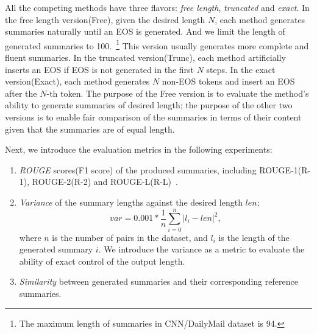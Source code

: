 All the competing methods
have three flavors: {\em free length}, {\em truncated} and {\em exact}.
In the free length version(Free), given the desired length $N$,
each method generates summaries naturally until
an EOS is generated. And we limit the length of generated 
summaries to 100.~\footnote{The maximum length of summaries in CNN/DailyMail dataset is 94.}
This version usually generates
more complete and fluent summaries.
In the truncated version(Trunc), each method artificially
inserts an EOS if EOS is not generated in the first $N$ steps.
In the exact version(Exact), each method
generates $N$ non-EOS tokens and insert an EOS after the $N$-th token.
The purpose of the Free version is to evaluate the method's ability to
generate summaries of desired length; the purpose of the other
two versions is to enable fair comparison of the summaries in terms of
their content given that the summaries are of equal length. 

Next, we introduce the evaluation metrics in the following experiments:
\begin{enumerate}
\item \textit{ROUGE} scores(F1 score) of the produced
summaries, including ROUGE-1(R-1), ROUGE-2(R-2) and
ROUGE-L(R-L)~\cite{rouge-a-package-for-automatic-evaluation-of-summaries}.

\item \textit{Variance} of the summary lengths against
the desired length $len$;
\begin{equation}
var = 0.001 * \frac{1}{n}\sum_{i=0}^{n} |l_i - len|^2, 
\end{equation}
where $n$ is the number of pairs in the dataset, and $l_i$ is the length of
the generated summary $i$. 
We introduce the variance as a metric to evaluate the
ability of exact control of the output length.

\item \textit{Similarity} between generated summaries
and their corresponding reference summaries.
\end{enumerate}

